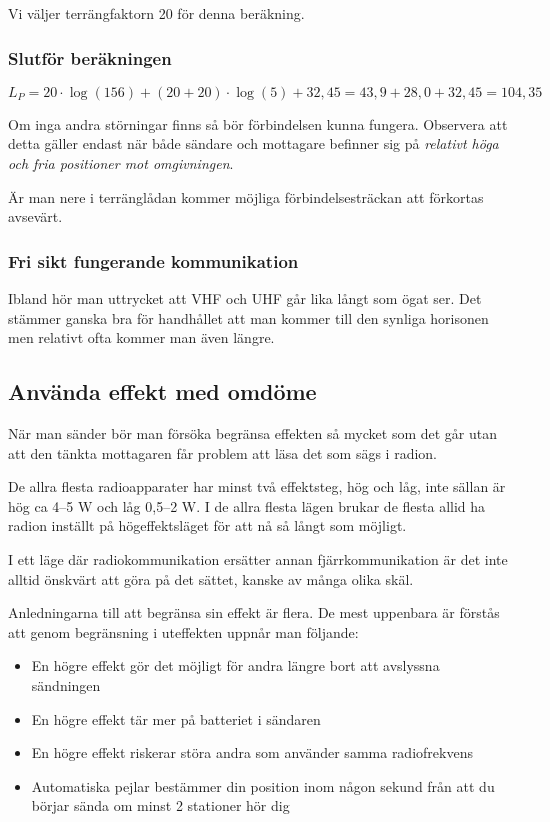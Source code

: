 Vi väljer terrängfaktorn 20 för denna beräkning.

\subsubsection{Slutför beräkningen}

\begin{equation}
L_P=20\cdot\log(156)+(20+20)\cdot\log(5)+32,45 = 43,9 + 28,0 + 32,45 = 104,35
\end{equation}

Om inga andra störningar finns så bör förbindelsen kunna fungera. Observera att detta gäller endast när både sändare och mottagare befinner sig på \textit{relativt höga och fria positioner mot omgivningen}. 

Är man nere i terränglådan kommer möjliga förbindelsesträckan att förkortas avsevärt.

\subsubsection{Fri sikt fungerande kommunikation}

Ibland hör man uttrycket att VHF och UHF går lika långt som ögat ser. Det stämmer ganska bra för handhållet att man kommer till den synliga horisonen men relativt ofta kommer man även längre.

\subsection{Använda effekt med omdöme}

När man sänder bör man försöka begränsa effekten så mycket som det går utan att den tänkta mottagaren får problem att läsa det som sägs i radion. 

De allra flesta radioapparater har minst två effektsteg, hög och låg, inte sällan är hög ca 4--5 W och låg 0,5--2 W. I de allra flesta lägen brukar de flesta allid ha radion inställt på högeffektsläget för att nå så långt som möjligt.

I ett läge där radiokommunikation ersätter annan fjärrkommunikation är det inte alltid önskvärt att göra på det sättet, kanske av många olika skäl.

Anledningarna till att begränsa sin effekt är flera. De mest uppenbara är förstås att genom begränsning i uteffekten uppnår man följande:

\begin{itemize}
	\item En högre effekt gör det möjligt för andra längre bort att avslyssna sändningen
	\item En högre effekt tär mer på batteriet i sändaren
	\item En högre effekt riskerar störa andra som använder samma radiofrekvens
	\item Automatiska pejlar bestämmer din position inom någon sekund från att du börjar sända om minst 2 stationer hör dig
\end{itemize}

